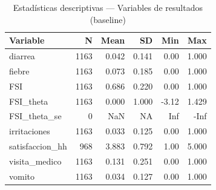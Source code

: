 \begin{table}[!h]
\centering
\caption{Estadísticas descriptivas — Variables de resultados (baseline)}
\centering
\begin{tabular}[t]{lrrrrr}
\toprule
Variable & N & Mean & SD & Min & Max\\
\midrule
diarrea & 1163 & 0.042 & 0.141 & 0.00 & 1.000\\
fiebre & 1163 & 0.073 & 0.185 & 0.00 & 1.000\\
FSI & 1163 & 0.686 & 0.220 & 0.00 & 1.000\\
FSI\_theta & 1163 & 0.000 & 1.000 & -3.12 & 1.429\\
FSI\_theta\_se & 0 & NaN & NA & Inf & -Inf\\
\addlinespace
irritaciones & 1163 & 0.033 & 0.125 & 0.00 & 1.000\\
satisfaccion\_hh & 968 & 3.883 & 0.792 & 1.00 & 5.000\\
visita\_medico & 1163 & 0.131 & 0.251 & 0.00 & 1.000\\
vomito & 1163 & 0.034 & 0.127 & 0.00 & 1.000\\
\bottomrule
\end{tabular}
\end{table}
